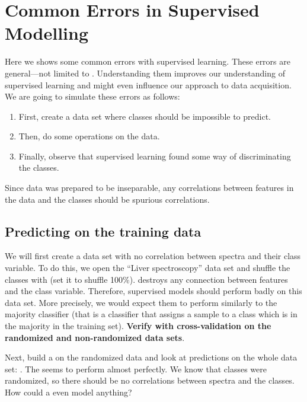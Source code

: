 \chapter{Common Errors in Supervised Modelling}

Here we shows some common errors with supervised learning. These errors are general---not limited to \mutation. Understanding them improves our understanding of supervised learning and might even influence our approach to data acquisition. We are going to simulate these errors as follows:

\begin{enumerate}
\item First, create a data set where classes should be impossible to predict.
\item Then, do some operations on the data.
\item Finally, observe that supervised learning found some way of discriminating the classes.
\end{enumerate}

Since data was prepared to be inseparable, any correlations between features in the data and the classes should be spurious correlations.


\section{Predicting on the training data}

We will first create a data set with no correlation between spectra and their class variable. To do this, we open the ``Liver spectroscopy'' data set and shuffle the classes with  (set it to shuffle 100\%).  destroys any connection between features and the class variable. Therefore, supervised models should perform badly on this data set. More precisely, we would expect them to perform similarly to the majority classifier (that is a classifier that assigns a sample to a class which is in the majority in the training set). \textbf{Verify with cross-validation on the randomized and non-randomized data sets}.

Next, build a  on the randomized data and look at predictions on the whole data set: . The  seems to perform almost perfectly. We know that classes were randomized, so there should be no correlations between spectra and the classes. How could a  even model anything?

